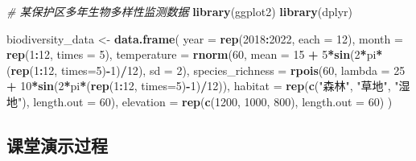 \documentclass[
]{book}
\newenvironment{Shaded}{\begin{snugshade}}{\end{snugshade}}
\newcommand{\AttributeTok}[1]{\textcolor[rgb]{0.13,0.29,0.53}{#1}}
\newcommand{\CommentTok}[1]{\textcolor[rgb]{0.56,0.35,0.01}{\textit{#1}}}
\newcommand{\DecValTok}[1]{\textcolor[rgb]{0.00,0.00,0.81}{#1}}
\newcommand{\FunctionTok}[1]{\textcolor[rgb]{0.13,0.29,0.53}{\textbf{#1}}}
\newcommand{\NormalTok}[1]{#1}
\newcommand{\OtherTok}[1]{\textcolor[rgb]{0.56,0.35,0.01}{#1}}
\newcommand{\SpecialCharTok}[1]{\textcolor[rgb]{0.81,0.36,0.00}{\textbf{#1}}}
\newcommand{\StringTok}[1]{\textcolor[rgb]{0.31,0.60,0.02}{#1}}
\begin{document}
\begin{Shaded}
\begin{Highlighting}[]
\CommentTok{\# 某保护区多年生物多样性监测数据}
\FunctionTok{library}\NormalTok{(ggplot2)}
\FunctionTok{library}\NormalTok{(dplyr)}

\NormalTok{biodiversity\_data }\OtherTok{\textless{}{-}} \FunctionTok{data.frame}\NormalTok{(}
  \AttributeTok{year =} \FunctionTok{rep}\NormalTok{(}\DecValTok{2018}\SpecialCharTok{:}\DecValTok{2022}\NormalTok{, }\AttributeTok{each =} \DecValTok{12}\NormalTok{),}
  \AttributeTok{month =} \FunctionTok{rep}\NormalTok{(}\DecValTok{1}\SpecialCharTok{:}\DecValTok{12}\NormalTok{, }\AttributeTok{times =} \DecValTok{5}\NormalTok{),}
  \AttributeTok{temperature =} \FunctionTok{rnorm}\NormalTok{(}\DecValTok{60}\NormalTok{, }\AttributeTok{mean =} \DecValTok{15} \SpecialCharTok{+} \DecValTok{5}\SpecialCharTok{*}\FunctionTok{sin}\NormalTok{(}\DecValTok{2}\SpecialCharTok{*}\NormalTok{pi}\SpecialCharTok{*}\NormalTok{(}\FunctionTok{rep}\NormalTok{(}\DecValTok{1}\SpecialCharTok{:}\DecValTok{12}\NormalTok{, }\AttributeTok{times=}\DecValTok{5}\NormalTok{)}\SpecialCharTok{{-}}\DecValTok{1}\NormalTok{)}\SpecialCharTok{/}\DecValTok{12}\NormalTok{), }\AttributeTok{sd =} \DecValTok{2}\NormalTok{),}
  \AttributeTok{species\_richness =} \FunctionTok{rpois}\NormalTok{(}\DecValTok{60}\NormalTok{, }\AttributeTok{lambda =} \DecValTok{25} \SpecialCharTok{+} \DecValTok{10}\SpecialCharTok{*}\FunctionTok{sin}\NormalTok{(}\DecValTok{2}\SpecialCharTok{*}\NormalTok{pi}\SpecialCharTok{*}\NormalTok{(}\FunctionTok{rep}\NormalTok{(}\DecValTok{1}\SpecialCharTok{:}\DecValTok{12}\NormalTok{, }\AttributeTok{times=}\DecValTok{5}\NormalTok{)}\SpecialCharTok{{-}}\DecValTok{1}\NormalTok{)}\SpecialCharTok{/}\DecValTok{12}\NormalTok{)),}
  \AttributeTok{habitat =} \FunctionTok{rep}\NormalTok{(}\FunctionTok{c}\NormalTok{(}\StringTok{"森林"}\NormalTok{, }\StringTok{"草地"}\NormalTok{, }\StringTok{"湿地"}\NormalTok{), }\AttributeTok{length.out =} \DecValTok{60}\NormalTok{),}
  \AttributeTok{elevation =} \FunctionTok{rep}\NormalTok{(}\FunctionTok{c}\NormalTok{(}\DecValTok{1200}\NormalTok{, }\DecValTok{1000}\NormalTok{, }\DecValTok{800}\NormalTok{), }\AttributeTok{length.out =} \DecValTok{60}\NormalTok{)}
\NormalTok{)}
\end{Highlighting}
\end{Shaded}

\hypertarget{ux8bfeux5802ux6f14ux793aux8fc7ux7a0b-9}{%
\subsection{课堂演示过程}\label{ux8bfeux5802ux6f14ux793aux8fc7ux7a0b-9}}
\end{document}
